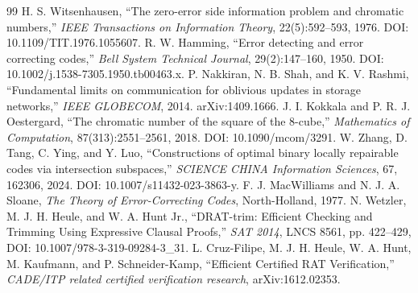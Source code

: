 \documentclass[11pt,a4paper]{article}
\begin{document}
\begin{thebibliography}{99}\small
{} H. S. Witsenhausen, ``The zero-error side information problem and chromatic numbers,'' \emph{IEEE Transactions on Information Theory}, 22(5):592--593, 1976. DOI: 10.1109/TIT.1976.1055607.
 R. W. Hamming, ``Error detecting and error correcting codes,'' \emph{Bell System Technical Journal}, 29(2):147--160, 1950. DOI: 10.1002/j.1538-7305.1950.tb00463.x.
 P. Nakkiran, N. B. Shah, and K. V. Rashmi, ``Fundamental limits on communication for oblivious updates in storage networks,'' \emph{IEEE GLOBECOM}, 2014. arXiv:1409.1666.
 J. I. Kokkala and P. R. J. Oestergard, ``The chromatic number of the square of the 8-cube,'' \emph{Mathematics of Computation}, 87(313):2551--2561, 2018. DOI: 10.1090/mcom/3291.
 W. Zhang, D. Tang, C. Ying, and Y. Luo, ``Constructions of optimal binary locally repairable codes via intersection subspaces,'' \emph{SCIENCE CHINA Information Sciences}, 67, 162306, 2024. DOI: 10.1007/s11432-023-3863-y.
 F. J. MacWilliams and N. J. A. Sloane, \emph{The Theory of Error-Correcting Codes}, North-Holland, 1977.
 N. Wetzler, M. J. H. Heule, and W. A. Hunt Jr., ``DRAT-trim: Efficient Checking and Trimming Using Expressive Clausal Proofs,'' \emph{SAT 2014}, LNCS 8561, pp. 422--429, DOI: 10.1007/978-3-319-09284-3\_31.
 L. Cruz-Filipe, M. J. H. Heule, W. A. Hunt, M. Kaufmann, and P. Schneider-Kamp, ``Efficient Certified RAT Verification,'' \emph{CADE/ITP related certified verification research}, arXiv:1612.02353.

\end{thebibliography}
\end{document}
